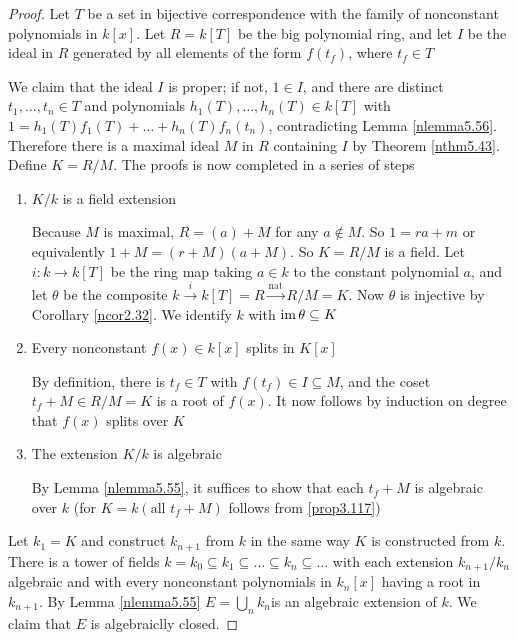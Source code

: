 \documentclass[11pt]{article}
\begin{document}
\begin{proof}
Let \(T\) be a set in bijective correspondence with the family of nonconstant
polynomials in \(k[x]\). Let \(R=k[T]\) be the big polynomial ring, and let
\(I\) be the ideal in \(R\) generated by all elements of the form \(f(t_f)\),
where \(t_f\in T\)

We claim that the ideal \(I\) is proper; if not, \(1\in I\), and there are
distinct \(t_1,\dots,t_n\in T\) and polynomials \(h_1(T),\dots,h_n(T)\in
   k[T]\) with \(1=h_1(T)f_1(T)+\dots+h_n(T)f_n(t_n)\), contradicting Lemma
\ref{nlemma5.56}. Therefore there is a maximal ideal \(M\) in \(R\) containing \(I\)
by Theorem \ref{nthm5.43}. Define \(K=R/M\). The proofs is now completed in a
series of steps
\begin{enumerate}
\item \(K/k\) is a field extension

 Because \(M\) is maximal, \(R=(a)+M\) for any \(a\not\in M\). So \(1=ra+m\)
 or equivalently \(1+M=(r+M)(a+M)\). So \(K=R/M\) is a field. Let 
 \(i:k\to k[T]\) be the ring map taking \(a\in k\) to the constant
 polynomial \(a\), and let \(\theta\) be the composite 
\(k\xrightarrow{i}k[T]=R\xrightarrow{\text{nat}}R/M=K\). Now \(\theta\) is injective
 by Corollary \ref{ncor2.32}. We identify \(k\) with \(\operatorname{im}\theta\subseteq K\)

\item Every nonconstant \(f(x)\in k[x]\) splits in \(K[x]\)

By definition, there is \(t_f\in T\) with \(f(t_f)\in I\subseteq M\), and
the coset \(t_f+M\in R/M=K\) is a root of \(f(x)\). It now follows by
induction on degree that \(f(x)\) splits over \(K\)

\item The extension \(K/k\) is algebraic

By Lemma \ref{nlemma5.55}, it suffices to show that each \(t_f+M\) is
algebraic over \(k\) (for \(K=k(\text{all }t_f+M)\) follows from
\ref{prop3.117})
\end{enumerate}


Let \(k_1=K\) and construct \(k_{n+1}\) from \(k\) in the same way \(K\) is
constructed from \(k\). There is a tower of fields 
\(k=k_0\subseteq k_1\subseteq \dots\subseteq k_n\subseteq\dots\) with each
extension \(k_{n+1}/k_n\) algebraic and with every nonconstant polynomials in
\(k_n[x]\) having a root in \(k_{n+1}\). By Lemma \ref{nlemma5.55}
\(E=\bigcup_nk_n\)is an algebraic extension of \(k\). We claim that \(E\) is
algebraiclly closed.
\end{proof}
\end{document}
